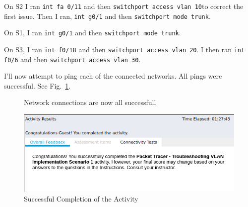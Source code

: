 \documentclass[../EngineeringJournal_CDavis.tex]{subfiles}
\begin{document}

On S2 I ran {\scriptsize{\verb$int fa 0/11$}\normalsize} and then
{\scriptsize{\verb$switchport access vlan 10$}\normalsize}to correct the first
issue.
Then I ran, {\scriptsize{\verb$int g0/1$}\normalsize} and then
{\scriptsize{\verb$switchport mode trunk$}\normalsize}. 

On S1, I ran {\scriptsize{\verb$int g0/1$}\normalsize} and then
{\scriptsize{\verb$switchport mode trunk$}\normalsize}.

On S3, I ran {\scriptsize{\verb$int f0/18$}\normalsize} and then
{\scriptsize{\verb$switchport access vlan 20$}\normalsize}.
I then ran {\scriptsize{\verb$int f0/6$}\normalsize} and then
{\scriptsize{\verb$switchport access vlan 30$}\normalsize}.

I'll now attempt to ping each of the connected networks.
All pings were successful. See Fig.~\ref{Success11}.


\begin{figure}[!hbt]\centering
{}\par
{}\hfill
{}\par
\caption{Network connections are now all successfull}\label{Success11}
\end{figure}



\begin{figure}[!hbt]\centering
\includegraphics[width=.45\linewidth]{Figures/2020-03-08-075242_571x209_scrot.png}
\caption{Successful Completion of the Activity}\label{Complete11}
\end{figure}

\end{document}
